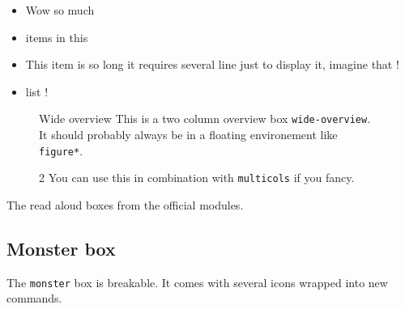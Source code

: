 \begin{textbox}
  \lipsum[][1-2]
	\begin{itemize}
		\item Wow so much
		\item items in this
		\item This item is so long it requires several line just to display it, imagine that !
		\item list !
	\end{itemize}
\end{textbox}


\begin{figure}[b!]
	\begin{wide-overview}{Wide overview}
		This is a two column overview box \texttt{wide-overview}. It should probably always be in a floating environement like \texttt{figure*}.



		\begin{multicols}{2}
			You can use this in combination with \texttt{multicols} if you fancy.

			\vspace{1cm}

			\lipsum[1]
		\end{multicols}
	\end{wide-overview}
\end{figure}

The read aloud boxes from the official modules.

\begin{dndreadaloud}
\lipsum[1]
\end{dndreadaloud}

\subsection{Monster box}

The \texttt{monster} box is breakable. It comes with several icons wrapped into new commands.



